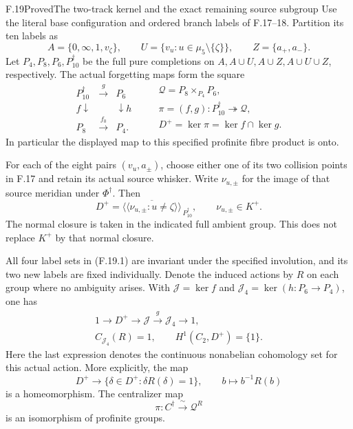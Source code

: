 \begin{claim}{F.19}{Proved}{The two-track kernel and the exact remaining source subgroup}
Use the literal base configuration and ordered branch labels of
F.17--18.  Partition its ten labels as
\[
 A=\{0,\infty,1,v_\zeta\},\qquad
 U=\{v_u:u\in\mu _5\setminus\{\zeta\}\},\qquad
 Z=\{a_+,a_-\}.
                                                               \tag{F.19.1}
\]
Let \(P_4,P_8,P_6,P_{10}^{\dagger}\) be the full pure
completions on \(A,A\cup U,A\cup Z,A\cup U\cup Z\), respectively.
The actual forgetting maps form the square
\[
 \begin{array}{ccc}
 P_{10}^{\dagger}&\xrightarrow{\ g\ }&P_6\\
 {\scriptstyle f}\downarrow&&\downarrow{\scriptstyle h}\\
 P_8&\xrightarrow{\ f_0\ }&P_4 .
 \end{array}
 \qquad
 \begin{gathered}
 \mathcal Q=P_8\times_{P_4}P_6,\\
 \pi=(f,g):P_{10}^{\dagger}\twoheadrightarrow\mathcal Q,\\
 D^+=\ker\pi=\ker f\cap\ker g .
 \end{gathered}                                                 \tag{F.19.2}
\]
In particular the displayed map to this specified profinite
fibre product is onto.

For each of the eight pairs \((v_u,a_\pm)\), choose either one
of its two collision points in F.17 and retain its actual
source whisker.  Write \(\nu_{u,\pm}\) for the image of that
source meridian under \(\Phi^\dagger\).
Then
\[
 D^+=\overline{\langle\!\langle
               \nu_{u,\pm}:u\ne\zeta
                         \rangle\!\rangle}_{\,P_{10}^{\dagger}},
 \qquad \nu_{u,\pm}\in K^+ .
                                                               \tag{F.19.3}
\]
The normal closure is taken in the indicated full ambient
group.  This does not replace \(K^+\) by that normal closure.

All four label sets in (F.19.1) are invariant under the
specified involution, and its two new labels are fixed
individually.  Denote the induced actions by \(R\) on each
group where no ambiguity arises.  With
\(\mathcal J=\ker f\) and
\(\mathcal J_4=\ker(h:P_6\to P_4)\), one has
\[
 \begin{gathered}
 1\longrightarrow D^+\longrightarrow\mathcal J
       \xrightarrow{\ g\ }\mathcal J_4\longrightarrow1,\\
 C_{\mathcal J_4}(R)=1,\qquad
 H^1(C_2,D^+)=\{1\}.
 \end{gathered}                                                 \tag{F.19.4}
\]
Here the last expression denotes the continuous nonabelian
cohomology set for this actual action.
More explicitly, the map
\[
 D^+\longrightarrow
     \{\delta\in D^+:\delta R(\delta)=1\},\qquad
                b\longmapsto b^{-1}R(b)
                                                               \tag{F.19.5}
\]
is a homeomorphism.
The centralizer map
\[
          \pi:C^\dagger\xrightarrow{\ \sim\ }\mathcal Q^R
                                                               \tag{F.19.6}
\]
is an isomorphism of profinite groups.


\end{claim}
